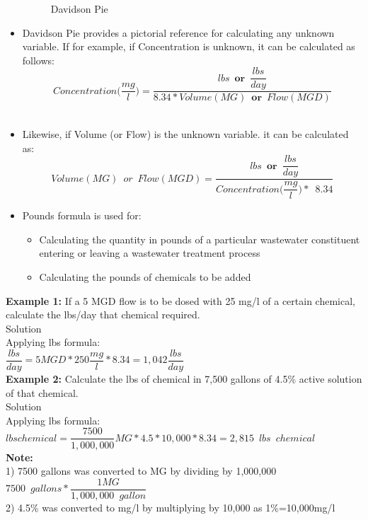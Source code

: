 \begin{itemize}
\begin{figure}[h]
\caption{Davidson Pie}
\end{figure}
\vspace{0.2cm}
\item Davidson Pie provides a pictorial reference for calculating any unknown variable.  If for example, if Concentration is unknown, it can be calculated as follows: \\$$Concentration\Big(\frac{mg}{l}\Big)=\dfrac{lbs \enspace \textbf{or} \enspace \dfrac{lbs}{day}}{8.34*Volume(MG) \enspace \textbf{or} \enspace Flow (MGD)}$$\\
\vspace{0.2cm}
\item Likewise, if Volume (or Flow) is the unknown variable. it can be calculated as:  \\$$Volume (MG) \enspace or \enspace Flow(MGD)=\dfrac{lbs \enspace \textbf{or} \enspace \dfrac{lbs}{day}}{Concentration\Big(\dfrac{mg}{l}\Big)* \enspace 8.34  }$$
\vspace{0.2cm}
\item Pounds formula is used for:
\begin{itemize}
\item Calculating the quantity in pounds of a particular wastewater constituent entering or leaving a wastewater treatment process
\item Calculating the pounds of chemicals to be added\\
\end{itemize}
\end{itemize}


\textbf{Example 1:} If a 5 MGD flow is to be dosed with 25 mg/l of a certain chemical, calculate the lbs/day that chemical required.\\

Solution\\

Applying lbs formula:\\
$\dfrac{lbs}{day}=5 MGD *250\dfrac{mg}{l}*8.34 = \boxed{1,042\dfrac{lbs}{day}}$
\\
\vspace{6pt}
\textbf{Example 2:} Calculate the lbs of chemical in 7,500 gallons of 4.5\% active solution of that chemical.\\
Solution\\
Applying lbs formula:\\
$lbs chemical = \dfrac{7500}{1,000,000}MG * 4.5*10,000 *8.34 = \boxed{2,815 \enspace lbs \enspace chemical}$\\
\textbf{Note:}\\  
1) 7500 gallons was converted to MG by dividing by 1,000,000\\
$7500 \enspace gallons * \dfrac{1 MG}{1,000,000 \enspace gallon}$\\
2) 4.5\% was converted to mg/l by multiplying by 10,000 as 1\%=10,000mg/l


